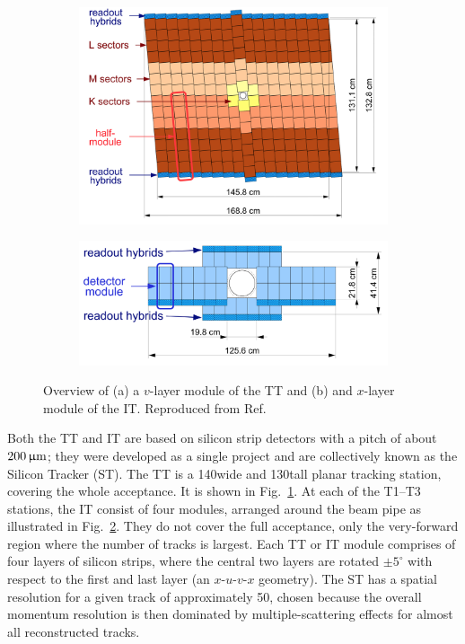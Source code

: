 \begin{figure}[tb]
    \centering
    \begin{subfigure}{0.55\columnwidth}
        \includegraphics[width=\columnwidth]{figures/detector/TT_station.png}
        \caption{\label{fig:TT_station}}
    \end{subfigure}
    \begin{subfigure}{0.42\columnwidth}
        \includegraphics[width=\columnwidth]{figures/detector/IT_station.png}
        \caption{\label{fig:IT_station}}
    \end{subfigure}
    \caption{Overview of (a) a $v$-layer module of the TT and (b) and $x$-layer module of the IT. Reproduced from Ref.~\cite{LHCb-detector}}
    \label{fig:TT_IT_stations}
\end{figure}

Both the TT and IT are based on silicon strip detectors with a pitch of about $200\,\upmu\text{m}$; they were developed as a single project and are collectively known as the Silicon Tracker (ST). The TT  is a 140\cm wide and 130\cm tall planar tracking station, covering the whole \lhcb acceptance. It is shown in Fig.~\ref{fig:TT_station}. At each of the T1--T3 stations,  the IT consist of four modules, arranged around the beam pipe as illustrated in Fig.~\ref{fig:IT_station}. They do not cover the full \lhcb acceptance, only the very-forward region where the number of tracks is largest. Each TT or IT module comprises of four layers of silicon strips, where the central two layers are rotated $\pm5^\circ$ with respect to the first and last layer (an $x$-$u$-$v$-$x$ geometry). The ST has a spatial resolution for a given track of approximately 50\mum, chosen because the overall momentum resolution is then dominated by multiple-scattering effects for almost all reconstructed tracks.

